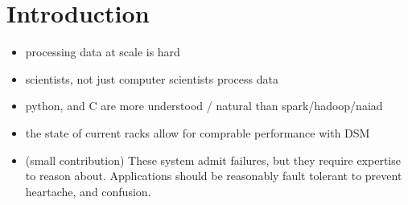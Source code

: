 \section{Introduction} 
\label{sec:intro}

\begin{itemize}
        \item processing data at scale is hard
        \item scientists, not just computer scientists process data
        \item python, and C are more understood / natural than spark/hadoop/naiad
        \item the state of current racks allow for comprable performance with DSM
        \item (small contribution) These system admit failures, but they require expertise to reason about. Applications should be reasonably fault tolerant to prevent heartache, and confusion.
\end{itemize}

